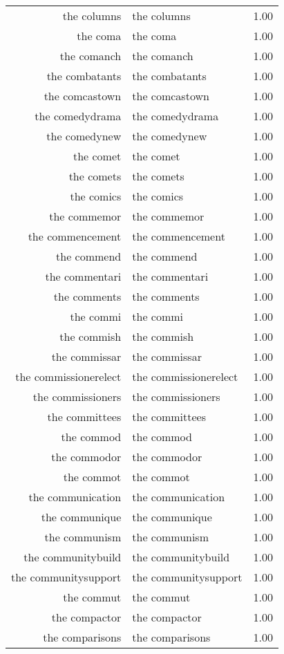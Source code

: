 \begin{table}[ht]
\begin{tabular}{rlr}
  the columns & the columns & 1.00 \\ 
  the coma & the coma & 1.00 \\ 
  the comanch & the comanch & 1.00 \\ 
  the combatants & the combatants & 1.00 \\ 
  the comcastown & the comcastown & 1.00 \\ 
  the comedydrama & the comedydrama & 1.00 \\ 
  the comedynew & the comedynew & 1.00 \\ 
  the comet & the comet & 1.00 \\ 
  the comets & the comets & 1.00 \\ 
  the comics & the comics & 1.00 \\ 
  the commemor & the commemor & 1.00 \\ 
  the commencement & the commencement & 1.00 \\ 
  the commend & the commend & 1.00 \\ 
  the commentari & the commentari & 1.00 \\ 
  the comments & the comments & 1.00 \\ 
  the commi & the commi & 1.00 \\ 
  the commish & the commish & 1.00 \\ 
  the commissar & the commissar & 1.00 \\ 
  the commissionerelect & the commissionerelect & 1.00 \\ 
  the commissioners & the commissioners & 1.00 \\ 
  the committees & the committees & 1.00 \\ 
  the commod & the commod & 1.00 \\ 
  the commodor & the commodor & 1.00 \\ 
  the commot & the commot & 1.00 \\ 
  the communication & the communication & 1.00 \\ 
  the communique & the communique & 1.00 \\ 
  the communism & the communism & 1.00 \\ 
  the communitybuild & the communitybuild & 1.00 \\ 
  the communitysupport & the communitysupport & 1.00 \\ 
  the commut & the commut & 1.00 \\ 
  the compactor & the compactor & 1.00 \\ 
  the comparisons & the comparisons & 1.00 \\ 

\end{tabular}
\end{table}
